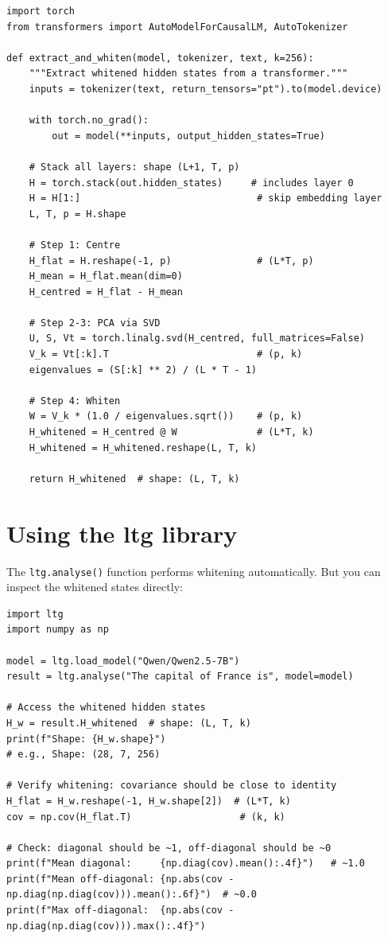 \documentclass[11pt, twoside, openright]{memoir}
\begin{document}
\begin{lstlisting}[caption={Whitening hidden states from a Hugging Face model}]
import torch
from transformers import AutoModelForCausalLM, AutoTokenizer

def extract_and_whiten(model, tokenizer, text, k=256):
    """Extract whitened hidden states from a transformer."""
    inputs = tokenizer(text, return_tensors="pt").to(model.device)

    with torch.no_grad():
        out = model(**inputs, output_hidden_states=True)

    # Stack all layers: shape (L+1, T, p)
    H = torch.stack(out.hidden_states)     # includes layer 0
    H = H[1:]                               # skip embedding layer
    L, T, p = H.shape

    # Step 1: Centre
    H_flat = H.reshape(-1, p)               # (L*T, p)
    H_mean = H_flat.mean(dim=0)
    H_centred = H_flat - H_mean

    # Step 2-3: PCA via SVD
    U, S, Vt = torch.linalg.svd(H_centred, full_matrices=False)
    V_k = Vt[:k].T                          # (p, k)
    eigenvalues = (S[:k] ** 2) / (L * T - 1)

    # Step 4: Whiten
    W = V_k * (1.0 / eigenvalues.sqrt())    # (p, k)
    H_whitened = H_centred @ W              # (L*T, k)
    H_whitened = H_whitened.reshape(L, T, k)

    return H_whitened  # shape: (L, T, k)
\end{lstlisting}

\section{Using the ltg library}

The \texttt{ltg.analyse()} function performs whitening automatically. But you
can inspect the whitened states directly:

\begin{lstlisting}[caption={Inspecting whitened hidden states with ltg}]
import ltg
import numpy as np

model = ltg.load_model("Qwen/Qwen2.5-7B")
result = ltg.analyse("The capital of France is", model=model)

# Access the whitened hidden states
H_w = result.H_whitened  # shape: (L, T, k)
print(f"Shape: {H_w.shape}")
# e.g., Shape: (28, 7, 256)

# Verify whitening: covariance should be close to identity
H_flat = H_w.reshape(-1, H_w.shape[2])  # (L*T, k)
cov = np.cov(H_flat.T)                   # (k, k)

# Check: diagonal should be ~1, off-diagonal should be ~0
print(f"Mean diagonal:     {np.diag(cov).mean():.4f}")   # ~1.0
print(f"Mean off-diagonal: {np.abs(cov - np.diag(np.diag(cov))).mean():.6f}")  # ~0.0
print(f"Max off-diagonal:  {np.abs(cov - np.diag(np.diag(cov))).max():.4f}")
\end{lstlisting}
\end{document}
